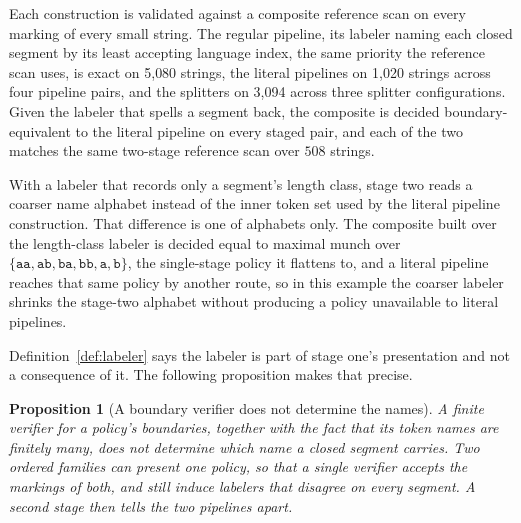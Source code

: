 \documentclass[11pt,a4paper]{article}
\theoremstyle{definition}
\theoremstyle{plain}
\newtheorem{proposition}{Proposition}
\newcommand{\code}[1]{\texttt{#1}}
\begin{document}
Each construction is validated against a composite reference scan on every marking of every small string. The regular
pipeline, its labeler naming each closed segment by its least accepting language index, the same priority the reference
scan uses, is exact on 5{,}080 strings, the literal pipelines on 1{,}020 strings across four pipeline pairs, and the
splitters on 3{,}094 across three splitter configurations. Given the labeler that spells a segment back, the composite
is decided boundary-equivalent to the literal pipeline on every staged pair, and each of the two matches the same
two-stage reference scan over $508$ strings.

With a labeler that records only a segment's length class, stage two reads a coarser name alphabet instead of the inner
token set used by the literal pipeline construction. That difference is one of alphabets only. The composite built over
the length-class labeler is decided equal to maximal munch over
$\{\code{aa}, \code{ab}, \code{ba}, \code{bb}, \code{a}, \code{b}\}$, the single-stage policy it flattens to, and a
literal pipeline reaches that same policy by another route, so in this example the coarser labeler shrinks the stage-two
alphabet without producing a policy unavailable to literal pipelines.

Definition~\ref{def:labeler} says the labeler is part of stage one's presentation and not a consequence of it. The
following proposition makes that precise.

\begin{proposition}[A boundary verifier does not determine the names]\label{prop:labeler}
A finite verifier for a policy's boundaries, together with the fact that its token names are finitely many, does not
determine which name a closed segment carries. Two ordered families can present one policy, so that a single verifier
accepts the markings of both, and still induce labelers that disagree on every segment. A second stage then tells the
two pipelines apart.
\end{proposition}
\end{document}
